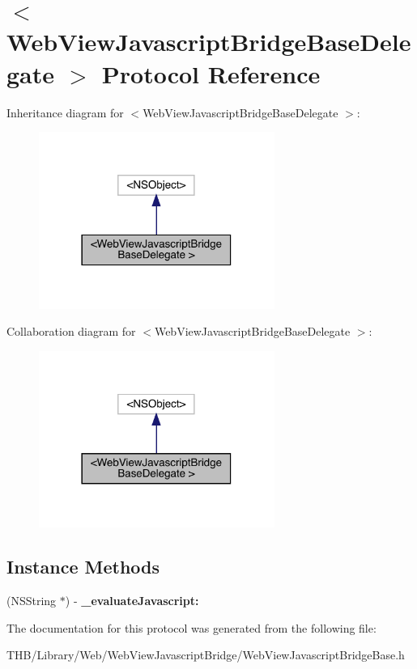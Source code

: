 \hypertarget{protocol_web_view_javascript_bridge_base_delegate_01-p}{}\section{$<$Web\+View\+Javascript\+Bridge\+Base\+Delegate $>$ Protocol Reference}
\label{protocol_web_view_javascript_bridge_base_delegate_01-p}


Inheritance diagram for $<$Web\+View\+Javascript\+Bridge\+Base\+Delegate $>$\+:\nopagebreak
\begin{figure}[H]
\begin{center}
\leavevmode
\includegraphics[width=218pt]{protocol_web_view_javascript_bridge_base_delegate_01-p__inherit__graph}
\end{center}
\end{figure}


Collaboration diagram for $<$Web\+View\+Javascript\+Bridge\+Base\+Delegate $>$\+:\nopagebreak
\begin{figure}[H]
\begin{center}
\leavevmode
\includegraphics[width=218pt]{protocol_web_view_javascript_bridge_base_delegate_01-p__coll__graph}
\end{center}
\end{figure}
\subsection*{Instance Methods}
\begin{DoxyCompactItemize}
\item 
\mbox{\label{protocol_web_view_javascript_bridge_base_delegate_01-p_a101188f75d32edcfbdf3898efe8d5bea}} 
(N\+S\+String $\ast$) -\/ {\bfseries \+\_\+evaluate\+Javascript\+:}
\end{DoxyCompactItemize}


The documentation for this protocol was generated from the following file\+:\begin{DoxyCompactItemize}
\item 
T\+H\+B/\+Library/\+Web/\+Web\+View\+Javascript\+Bridge/Web\+View\+Javascript\+Bridge\+Base.\+h\end{DoxyCompactItemize}
